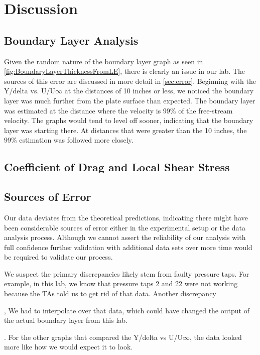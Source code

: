 \chapter{Discussion}
\label{cp:discussion}
\section{Boundary Layer Analysis}

Given the random nature of the boundary layer graph as seen in \autoref{fig:BoundaryLayerThicknessFromLE}, there is clearly an issue in our lab. The sources of this error are discussed in more detail in \autoref{sec:error}. Beginning with the Y/delta vs. U/U$\infty$ at the distances of 10 inches or less, we noticed the boundary layer was much further from the plate surface than expected. The boundary layer was estimated at the distance where the velocity is 99\% of the free-stream velocity. The graphs would tend to level off sooner, indicating that the boundary layer was starting there. At distances that were greater than the 10 inches, the 99\% estimation was followed more closely. 

\section{Coefficient of Drag and Local Shear Stress}


\section{Sources of Error} \label{sec:error}

Our data deviates from the theoretical predictions, indicating there might have been considerable sources of error either in the experimental setup or the data analysis process. Although we cannot assert the reliability of our analysis with full confidence further validation with additional data sets over more time would be required to validate our process.

We suspect the primary discrepancies likely stem from faulty pressure taps. For example, in this lab, we know that pressure taps 2 and 22 were not working because the TAs told us to get rid of that data. Another discrepancy 

, We had to interpolate over that data, which could have changed the output of the actual boundary layer from this lab. 

. For the other graphs that compared the Y/delta vs U/U$\infty$, the data looked more like how we would expect it to look.

